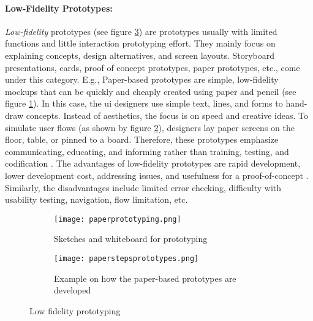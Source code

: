 \paragraph*{Low-Fidelity Prototypes:}
\textit{Low-fidelity} prototypes (see figure \ref{fig:background:lowfidelity}) are prototypes usually with limited functions and little interaction prototyping effort. 
They mainly focus on explaining concepts, design alternatives, and screen layouts. 
Storyboard presentations, cards, proof of concept prototypes, paper prototypes, etc., come under this category.
E.g., Paper-based prototypes are simple, low-fidelity mockups that can be quickly and cheaply created using paper and pencil (see figure \ref{fig:background:paperPrototyping}).
In this case, the \ac{ui} designers use simple text, lines, and forms to hand-draw concepts. 
Instead of aesthetics, the focus is on speed and creative ideas.
To simulate user flows (as shown by figure \ref{fig:background:paperprototypes}), designers lay paper screens on the floor, table, or pinned to a board.
Therefore, these prototypes emphasize communicating, educating, and informing rather than training, testing, and codification \cite{misc:prototyping:low}.
The advantages of low-fidelity prototypes are rapid development, lower development cost, addressing issues, and usefulness for a proof-of-concept \cite{article:prototyping:highlowfidelity}.
Similarly, the disadvantages include limited error checking, difficulty with usability testing, navigation, flow limitation, etc.
\begin{figure}[htbp!]
  \begin{subfigure}[b]{0.5\textwidth}
    \centering
    \texttt{[image: paperprototyping.png]}
    \caption{Sketches and whiteboard for prototyping}
    \label{fig:background:paperPrototyping}   
  \end{subfigure}             
  \begin{subfigure}[b]{0.5\textwidth}
    \centering
    \texttt{[image: paperstepsprototypes.png]}
    \caption[Paper based prototypes]{Example on how the paper-based prototypes are developed  \cite{misc:prototyping:uxpin}}
    \label{fig:background:paperprototypes}
  \end{subfigure}             
  \caption[Low fidelity prototyping]{Low fidelity prototyping}
  \label{fig:background:lowfidelity}
\end{figure}
